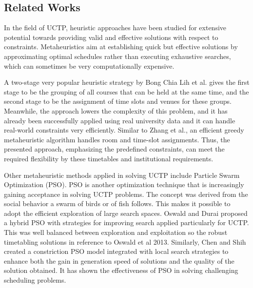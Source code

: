 \subsection{Related Works}
\label{subsec:relatedworks}

In the field of UCTP, heuristic approaches have been studied for extensive potential towards providing valid and effective solutions with respect to constraints. Metaheuristics aim at establishing quick but effective solutions by approximating optimal schedules rather than executing exhaustive searches, which can sometimes be very computationally expensive.

A two-stage very popular heuristic strategy by Bong Chia Lih et al. \cite{Lih2018-km} gives the first stage to be the grouping of all courses that can be held at the same time, and the second stage to be the assignment of time slots and venues for these groups. Meanwhile, the approach lowers the complexity of this problem, and it has already been successfully applied using real university data and it can handle real-world constraints very efficiently. Similar to Zhang et al., \cite{Zhang2014-ak} an efficient greedy metaheuristic algorithm handles room and time-slot assignments. Thus, the presented approach, emphasizing the predefined constraints, can meet the required flexibility by these timetables and institutional requirements.

Other metaheuristic methods applied in solving UCTP include Particle Swarm Optimization (PSO). PSO is another optimization technique that is increasingly gaining acceptance in solving UCTP problems. The concept was derived from the social behavior a swarm of birds or of fish follows. This makes it possible to adopt the efficient exploration of large search spaces. Oswald and Durai \cite{Oswald_C2013-zo} proposed a hybrid PSO with strategies for improving search applied particularly for UCTP. This was well balanced between exploration and exploitation so the robust timetabling solutions in reference to Oswald et al 2013. Similarly, Chen and Shih \cite{Chen2013-cp} created a constriction PSO model integrated with local search strategies to enhance both the gain in generation speed of solutions and the quality of the solution obtained. It has shown the effectiveness of PSO in solving challenging scheduling problems.

